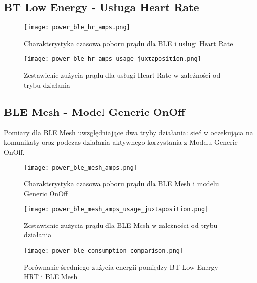 \subsection{BT Low Energy - Usługa Heart Rate}

\begin{figure}[!htb]
	\centering \texttt{[image: power\_ble\_hr\_amps.png]}
	\caption{Charakterystyka czasowa poboru prądu dla BLE i usługi Heart Rate}
	\label{rys:power_ble_hr_amps}
\end{figure}

\begin{figure}[!htb]
	\centering \texttt{[image: power\_ble\_hr\_amps\_usage\_juxtaposition.png]}
	\caption{Zestawienie zużycia prądu dla usługi Heart Rate w zależności od trybu działania}
	\label{rys:power_ble_hr_amps_usage_juxtaposition}
\end{figure}

\subsection{BLE Mesh - Model Generic OnOff}

Pomiary dla BLE Mesh uwzględniające dwa tryby działania: sieć w oczekująca na komunikaty oraz podczas działania aktywnego korzystania z Modelu Generic OnOff.

\begin{figure}[!htb]
	\centering \texttt{[image: power\_ble\_mesh\_amps.png]} 
	\caption{Charakterystyka czasowa poboru prądu dla BLE Mesh i modelu Generic OnOff}
	\label{rys:power_ble_mesh_amps}
\end{figure}

\begin{figure}[!htb]
	\centering \texttt{[image: power\_ble\_mesh\_amps\_usage\_juxtaposition.png]} 
	\caption{Zestawienie zużycia prądu dla BLE Mesh w zależności od trybu działania}
	\label{rys:power_ble_mesh_amps_usage_juxtaposition}
\end{figure}

\begin{figure}[!htb]
	\centering \texttt{[image: power\_ble\_consumption\_comparison.png]} 
	\caption{Porównanie średniego zużycia energii pomiędzy BT Low Energy HRT i BLE Mesh}
	\label{rys:power_ble_consumption_comparison}
\end{figure}



